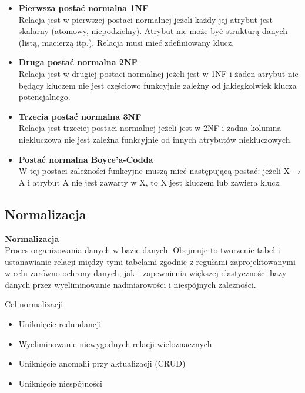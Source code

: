 \documentclass[12pt]{article}
\begin{document}
    \begin{itemize}
        \item \textbf{Pierwsza postać normalna 1NF}\\
        Relacja jest w pierwszej postaci normalnej jeżeli każdy jej atrybut jest skalarny (atomowy, niepodzielny). Atrybut nie może być strukturą danych (listą, macierzą itp.). Relacja musi mieć zdefiniowany klucz.
        \item \textbf{Druga postać normalna 2NF}\\
        Relacja jest w drugiej postaci normalnej jeżeli jest w 1NF i żaden atrybut nie będący kluczem nie jest częściowo funkcyjnie zależny od jakiegkolwiek klucza potencjalnego.
        \item \textbf{Trzecia postać normalna 3NF}\\
        Relacja jest trzeciej postaci normalnej jeżeli jest w 2NF i żadna kolumna niekluczowa nie jest zależna funkcyjnie od innych atrybutów niekluczowych.
        \item \textbf{Postać normalna Boyce'a-Codda}\\
        W tej postaci zależności funkcyjne muszą mieć następującą postać: jeżeli X → A i atrybut A nie jest zawarty w X, to X jest kluczem lub zawiera klucz.
    \end{itemize}
    
    \subsection{Normalizacja}
    \begin{definition}
    \textbf{Normalizacja}\\
    Proces organizowania danych w bazie danych. Obejmuje to tworzenie tabel i ustanawianie relacji między tymi tabelami zgodnie z regułami zaprojektowanymi w celu zarówno ochrony danych, jak i zapewnienia większej elastyczności bazy danych przez wyeliminowanie nadmiarowości i niespójnych zależności. 
    \end{definition}
    
    Cel normalizacji
    \begin{itemize}
        \item Uniknięcie redundancji
        \item Wyeliminowanie niewygodnych relacji wieloznacznych
        \item Uniknięcie anomalii przy aktualizacji (CRUD)
        \item Uniknięcie niespójności
    \end{itemize}
    
\end{document}
